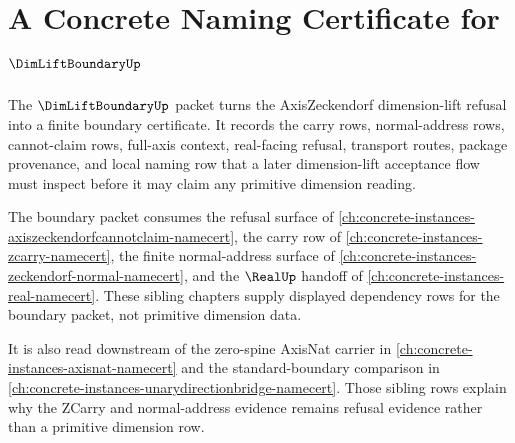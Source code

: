 \chapter{A Concrete Naming Certificate for $\DimLiftBoundaryUp$}
\label{ch:concrete-instances-dimliftboundary-namecert}

The $\DimLiftBoundaryUp$ packet turns the AxisZeckendorf dimension-lift refusal into a finite boundary certificate. It records the carry rows, normal-address rows, cannot-claim rows, full-axis context, real-facing refusal, transport routes, package provenance, and local naming row that a later dimension-lift acceptance flow must inspect before it may claim any primitive dimension reading.

The boundary packet consumes the refusal surface of \autoref{ch:concrete-instances-axiszeckendorfcannotclaim-namecert}, the carry row of \autoref{ch:concrete-instances-zcarry-namecert}, the finite normal-address surface of \autoref{ch:concrete-instances-zeckendorf-normal-namecert}, and the $\RealUp$ handoff of \autoref{ch:concrete-instances-real-namecert}. These sibling chapters supply displayed dependency rows for the boundary packet, not primitive dimension data.

It is also read downstream of the zero-spine AxisNat carrier in \autoref{ch:concrete-instances-axisnat-namecert} and the standard-boundary comparison in \autoref{ch:concrete-instances-unarydirectionbridge-namecert}. Those sibling rows explain why the ZCarry and normal-address evidence remains refusal evidence rather than a primitive dimension row.

